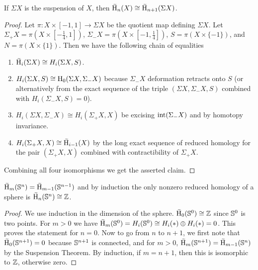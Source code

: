 \begin{cor}
    If $\Sigma X$ is the suspension of $X$, then $\wt{\rmH}_n(X)\cong \wt{\rmH}_{n+1}(\Sigma X)$.
\end{cor}
\begin{proof}
    Let $\pi:X\times [-1,1]\to \Sigma X$ be the quotient map defining $\Sigma X$. Let $\Sigma_+ X=\pi(X\times [-\frac 14,1])$, $\Sigma_-X=\pi(X\times [-1,\frac14])$, $S=\pi(X\times \{-1\})$, and $N=\pi(X\times\{1\})$. Then we have the following chain of equalities
    \begin{enumerate}
        \item $\wt{\rmH}_i(\Sigma X)\cong H_i(\Sigma X,S)$.
        \item $H_i(\Sigma X,S)\cong \mathrm{H}_0(\Sigma X,\Sigma_-X)$ because $\Sigma_-X$ deformation retracts onto $S$ (or alternatively from the exact sequence of the triple $(\Sigma X,\Sigma_- X,S)$ combined with $H_i(\Sigma_-X,S)=0$).
        \item $H_i(\Sigma X,\Sigma_-X)\cong H_i(\Sigma_+X,X)$ be excising $\operatorname{int}(\Sigma_-X)$ and by homotopy invariance.
        \item $H_i(\Sigma_+X,X)\cong \wt{\rmH}_{i-1}(X)$ by the long exact sequence of reduced homology for the pair $(\Sigma_+X,X)$ combined with contractibility of $\Sigma_+X$.
    \end{enumerate}
    Combining all four isomorphisms we get the asserted claim.
\end{proof}



\begin{cor}\label{reduced homology of spheres}
    $\wt{\rmH}_m(\bbS^n)=\wt{\rmH}_{m-1}(\bbS^{n-1})$ and by induction the only nonzero reduced homology of a sphere is $\wt{\rmH}_n(\bbS^n)\cong \bbZ$.
\end{cor}
\begin{proof}
     We use induction in the dimension of the sphere. $\wt{\rmH}_0(\bbS^0)\cong\bbZ$ since $\mathbb{S}^0$ is two points. For $m>0$ we have $\wt{\rmH}_m(\bbS^0)=H_i(\bbS^0)\cong H_i(\ast)\oplus H_i(\ast)=0$. This proves the statement for $n=0$. Now to go from $n$ to $n+1$, we first note that $\wt{\rmH}_0(\bbS^{n+1})=0$ because $\mathbb{S}^{n+1}$ is connected, and for $m>0$, $\wt{\rmH}_{m}(\bbS^{n+1})=\wt{\rmH}_{m-1}(\bbS^n)$ by the Suspension Theorem. By induction, if $m=n+1$, then this is isomorphic to $\mathbb{Z}$, otherwise zero.
\end{proof}

